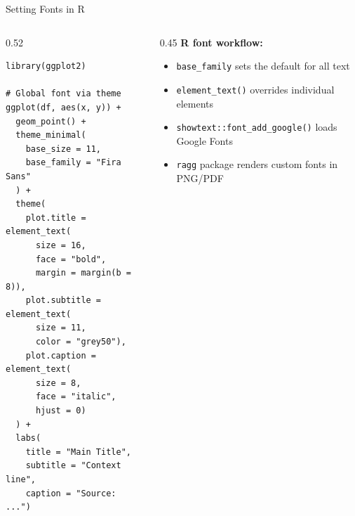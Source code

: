 \documentclass[10pt]{beamer}
\begin{document}
\begin{frame}[fragile]{Setting Fonts in R}
  \begin{columns}[T]
    \begin{column}{0.52\textwidth}
\begin{lstlisting}[style=rstyle]
library(ggplot2)

# Global font via theme
ggplot(df, aes(x, y)) +
  geom_point() +
  theme_minimal(
    base_size = 11,
    base_family = "Fira Sans"
  ) +
  theme(
    plot.title = element_text(
      size = 16,
      face = "bold",
      margin = margin(b = 8)),
    plot.subtitle = element_text(
      size = 11,
      color = "grey50"),
    plot.caption = element_text(
      size = 8,
      face = "italic",
      hjust = 0)
  ) +
  labs(
    title = "Main Title",
    subtitle = "Context line",
    caption = "Source: ...")
\end{lstlisting}
    \end{column}
    \begin{column}{0.45\textwidth}
      \textbf{R font workflow:}

      \begin{itemize}
        \item \texttt{base\_family} sets the
              default for all text
        \item \texttt{element\_text()} overrides
              individual elements
        \item \texttt{showtext::font\_add\_google()}
              loads Google Fonts
        \item \texttt{ragg} package renders
              custom fonts in PNG/PDF
      \end{itemize}
    \end{column}
  \end{columns}
\end{frame}
\end{document}

